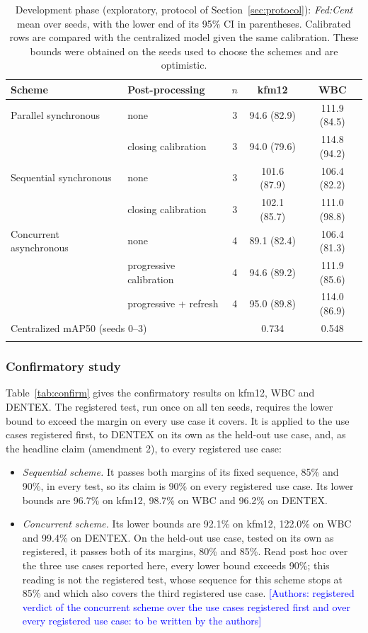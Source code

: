 \documentclass[pdflatex,sn-mathphys-num]{sn-jnl}
\newcommand{\authornote}[1]{\textcolor{blue}{[Authors: #1]}}
\newcommand{\fedcent}{\textit{Fed:Cent}}
\begin{document}
\begin{table}[t]
\caption{Development phase (exploratory, protocol of Section~\ref{sec:protocol}): \fedcent{} mean over seeds, with the lower end of its 95\% CI in parentheses. Calibrated rows are compared with the centralized model given the same calibration. These bounds were obtained on the seeds used to choose the schemes and are optimistic.}\label{tab:explore}
\footnotesize
\begin{tabular*}{\textwidth}{@{\extracolsep\fill}llccc}
\toprule
Scheme & Post-processing & $n$ & kfm12 & WBC \\
\midrule
Parallel synchronous & none & 3 & 94.6 (82.9) & 111.9 (84.5) \\
 & closing calibration & 3 & 94.0 (79.6) & 114.8 (94.2) \\
Sequential synchronous & none & 3 & 101.6 (87.9) & 106.4 (82.2) \\
 & closing calibration & 3 & 102.1 (85.7) & 111.0 (98.8) \\
Concurrent asynchronous & none & 4 & 89.1 (82.4) & 106.4 (81.3) \\
 & progressive calibration & 4 & 94.6 (89.2) & 111.9 (85.6) \\
 & progressive + refresh & 4 & 95.0 (89.8) & 114.0 (86.9) \\
\midrule
\multicolumn{3}{l}{Centralized mAP50 (seeds 0--3)} & 0.734 & 0.548 \\
\botrule
\end{tabular*}
\end{table}

\subsubsection{Confirmatory study}\label{sec:res-confirm}
Table~\ref{tab:confirm} gives the confirmatory results on kfm12, WBC and DENTEX. The registered test, run once on all ten seeds, requires the lower bound to exceed the margin on every use case it covers. It is applied to the use cases registered first, to DENTEX on its own as the held-out use case, and, as the headline claim (amendment 2), to every registered use case:
\begin{itemize}
\item \emph{Sequential scheme.} It passes both margins of its fixed sequence, 85\% and 90\%, in every test, so its claim is 90\% on every registered use case. Its lower bounds are 96.7\% on kfm12, 98.7\% on WBC and 96.2\% on DENTEX.
\item \emph{Concurrent scheme.} Its lower bounds are 92.1\% on kfm12, 122.0\% on WBC and 99.4\% on DENTEX. On the held-out use case, tested on its own as registered, it passes both of its margins, 80\% and 85\%. Read post hoc over the three use cases reported here, every lower bound exceeds 90\%; this reading is not the registered test, whose sequence for this scheme stops at 85\% and which also covers the third registered use case. \authornote{registered verdict of the concurrent scheme over the use cases registered first and over every registered use case: to be written by the authors}
\end{itemize}
\end{document}
